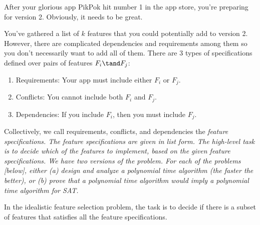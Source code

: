 \documentclass{article}
\begin{document}
 After your glorious app PikPok hit number 1 in the app store, you're
preparing for version 2.
Obviously, it needs to be great.

You've gathered a list of \( k \) features  that you could potentially add to version 2.
However, there are complicated dependencies and requirements among them so you don't necessarily want to add all of them.
There are 3 types of specifications defined over pairs of features \( F_i \tand F_j \): \begin{enumerate}
  \item Requirements: Your app must include either \( F_i \) or \( F_j \).
  \item Conflicts: You cannot include both \( F_i \) and \( F_j \).
  \item Dependencies: If you include \( F_i \), then you must include \( F_j \).
\end{enumerate}
Collectively, we call requirements, conflicts, and dependencies the \it{feature specifications}.
The feature specifications are given in list form.
The high-level task is to decide which of the features to implement, based on the given feature specifications.
We have two versions of the problem. For each of the problems [below], either (a) design and analyze a polynomial time algorithm (the faster the better), or (b) prove that a polynomial time algorithm would imply a polynomial time algorithm for SAT.
\setcounter{section}{10}
\setcounter{exercise}{3}



\begin{subexercise}
In the idealistic feature selection problem, the task is to decide if there is a subset of features that satisfies all the feature specifications.
\end{subexercise}
\end{document}
